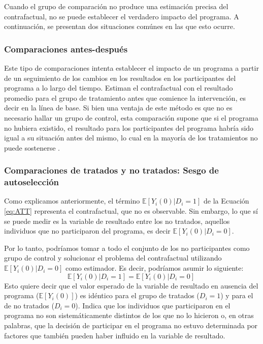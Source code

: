 \documentclass[../../main.tex]{subfiles}
\begin{document}
Cuando el grupo de comparación no produce una estimación precisa del contrafactual, no se
puede establecer el verdadero impacto del programa. A continuación, se presentan dos
situaciones comúnes en las que esto ocurre.

\subsubsection{Comparaciones antes-después}
Este tipo de comparaciones intenta establecer el impacto de un programa a partir de un
seguimiento de los cambios en los resultados en los participantes del programa a lo largo
del tiempo. Estiman el contrafactual con el resultado promedio para el grupo de
tratamiento antes que comience la intervención, es decir en la línea de base. Si bien una
ventaja de este método es que no es necesario hallar un grupo de control, esta comparación
supone que si el programa no hubiera existido, el resultado para los participantes del
programa habría sido igual a su situación antes del mismo, lo cual en la mayoría de los
tratamientos no puede sostenerse \cite{gertler-2016}.

\subsubsection{Comparaciones de tratados y no tratados: Sesgo de autoselección}
Como explicamos anteriormente, el término \(\mathbb{E} \left[Y_i(0)|D_i=1\right]\) de la
Ecuación \ref{eq:ATT} representa el contrafactual, que no es observable. Sin embargo, lo
que sí se puede medir es la variable de resultado entre los no tratados, aquellos
individuos que no participaron del programa, es decir \(\mathbb{E}
\left[Y_i(0)|D_i=0\right]\).

Por lo tanto, podríamos tomar a todo el conjunto de los no participantes como grupo de
control y solucionar el problema del contrafactual utilizando \(\mathbb{E}
\left[Y_i(0)|D_i=0\right]\) como estimador. Es decir, podríamos asumir lo siguiente:
\begin{equation}
    \mathbb{E} \left[Y_i(0)|D_i=1\right] = \mathbb{E} \left[Y_i(0)|D_i=0\right]\
    \label{eq:supuesto-1}  %
\end{equation}
Esto quiere decir que el valor esperado de la variable de resultado en ausencia del
programa (\(\mathbb{E}\left[Y_i(0)\right]\)) es idéntico para el grupo de tratados (\(D_i =
1\)) y para el de no tratados (\(D_i = 0\)). Indica que los individuos que participaron en el
programa no son sistemáticamente distintos de los que no lo hicieron \cite{bernal} o, en
otras palabras, que la decisión de participar en el programa no estuvo determinada por
factores que también pueden haber influido en la variable de resultado.
\end{document}
